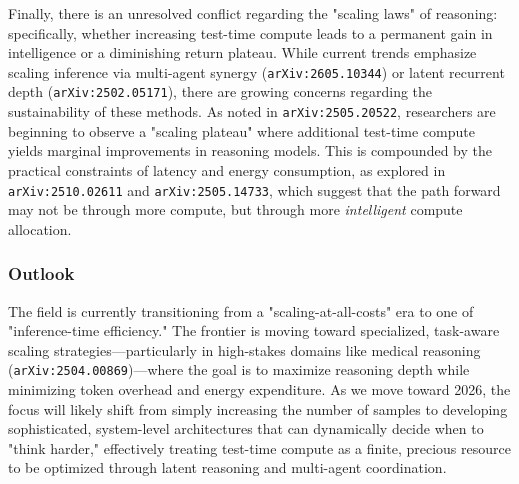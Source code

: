\documentclass[11pt]{article}
\begin{document}
Finally, there is an unresolved conflict regarding the "scaling laws" of reasoning: specifically, whether increasing test-time compute leads to a permanent gain in intelligence or a diminishing return plateau. While current trends emphasize scaling inference via multi-agent synergy (\texttt{arXiv:2605.10344}) or latent recurrent depth (\texttt{arXiv:2502.05171}), there are growing concerns regarding the sustainability of these methods. As noted in \texttt{arXiv:2505.20522}, researchers are beginning to observe a "scaling plateau" where additional test-time compute yields marginal improvements in reasoning models. This is compounded by the practical constraints of latency and energy consumption, as explored in \texttt{arXiv:2510.02611} and \texttt{arXiv:2505.14733}, which suggest that the path forward may not be through more compute, but through more \textit{intelligent} compute allocation.

\subsubsection{Outlook}

The field is currently transitioning from a "scaling-at-all-costs" era to one of "inference-time efficiency." The frontier is moving toward specialized, task-aware scaling strategies—particularly in high-stakes domains like medical reasoning (\texttt{arXiv:2504.00869})—where the goal is to maximize reasoning depth while minimizing token overhead and energy expenditure. As we move toward 2026, the focus will likely shift from simply increasing the number of samples to developing sophisticated, system-level architectures that can dynamically decide when to "think harder," effectively treating test-time compute as a finite, precious resource to be optimized through latent reasoning and multi-agent coordination.
\end{document}
